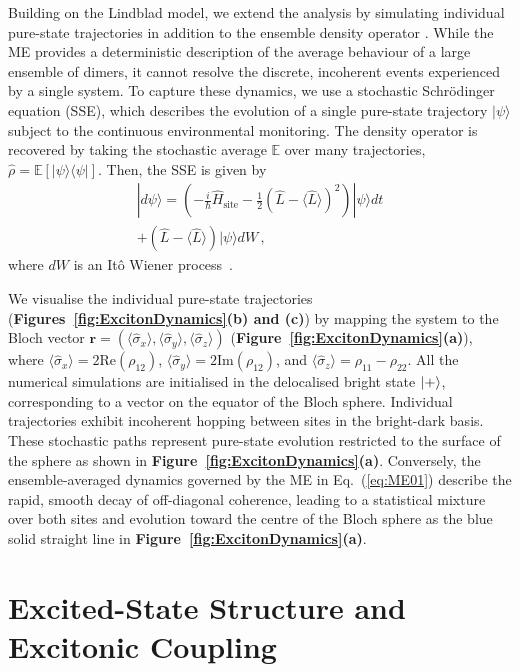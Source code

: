 \documentclass[journal=jpcbfk, manuscript=article, layout=twocolumn, doi=true]{achemso}
\begin{document}
Building on the Lindblad model, we extend the analysis by simulating individual pure-state trajectories in addition to the ensemble density operator \cite{abrahams2025excitonic}. While the ME provides a deterministic description of the average behaviour of a large ensemble of dimers, it cannot resolve the discrete, incoherent events experienced by a single system. To capture these dynamics, we use a stochastic Schrödinger equation (SSE), which describes the evolution of a single pure-state trajectory $|\psi\rangle$ subject to the continuous environmental monitoring. The density operator is recovered by taking the stochastic average $\mathbb{E}$ over many trajectories, $\hat{\rho} = \mathbb{E}[|\psi\rangle\langle\psi|]$. Then, the SSE is given by
\begin{multline}
    |d\psi\rangle = \left( -\frac{i}{\hbar}\hat{H}_{\text{site}} - \frac{1}{2}(\hat{L} - \langle \hat{L} \rangle)^2 \right) |\psi\rangle dt \\
    + (\hat{L} - \langle \hat{L} \rangle) |\psi\rangle dW \, ,
\end{multline}
where $dW$ is an It\^{o} Wiener process~\cite{petruccione}.

We visualise the individual pure-state trajectories (\textbf{Figures~\ref{fig:ExcitonDynamics}(b) and (c)}) by mapping the system to the Bloch vector $\mathbf{r} = (\langle\hat\sigma_x\rangle, \langle\hat\sigma_y\rangle, \langle\hat\sigma_z\rangle)$ (\textbf{Figure~\ref{fig:ExcitonDynamics}(a)}), where $\langle\hat\sigma_x\rangle = 2\text{Re}(\rho_{12})$, $\langle\hat\sigma_y\rangle = 2\text{Im}(\rho_{12})$, and $\langle\hat\sigma_z\rangle = \rho_{11} - \rho_{22}$. All the numerical simulations are initialised in the delocalised bright state $\ket{+}$, corresponding to a vector on the equator of the Bloch sphere. Individual trajectories exhibit incoherent hopping between sites in the bright-dark basis. These stochastic paths represent pure-state evolution restricted to the surface of the sphere as shown in \textbf{Figure~\ref{fig:ExcitonDynamics}(a)}. Conversely, the ensemble-averaged dynamics governed by the ME in Eq.~(\ref{eq:ME01}) describe the rapid, smooth decay of off-diagonal coherence, leading to a statistical mixture over both sites and evolution toward the centre of the Bloch sphere as the blue solid straight line in \textbf{Figure~\ref{fig:ExcitonDynamics}(a)}.

\section{Excited-State Structure and Excitonic Coupling}
\end{document}
